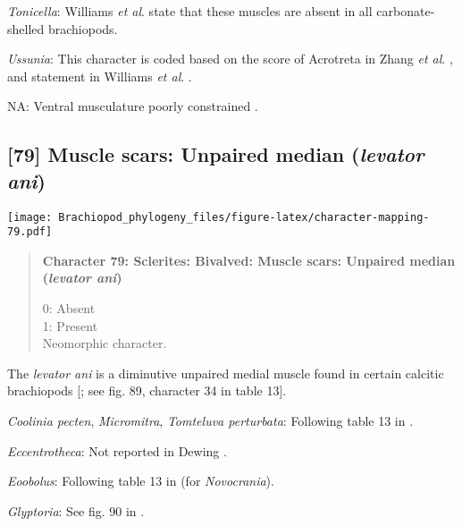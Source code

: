 \documentclass[openany]{book}
\theoremstyle{definition}
\theoremstyle{definition}
\theoremstyle{definition}
\theoremstyle{remark}
\begin{document}
\hypertarget{Tonicella-coding-78}{}
\emph{Tonicella}: Williams \emph{et al}.
\citeyearpar[p.~32]{Williams2000LinguliformeaCraniiformea} state that
these muscles are absent in all carbonate-shelled brachiopods.

\hypertarget{Ussunia-coding-78}{}
\emph{Ussunia}: This character is coded based on the score of Acrotreta
in Zhang \emph{et al}. \citeyearpar{Zhang2014Anearly}, and statement in
Williams \emph{et al}.
\citeyearpar[P.32]{Williams2000LinguliformeaCraniiformea}.

\hypertarget{NA-coding-78}{}
NA: Ventral musculature poorly constrained
\citep{Williams2000LinguliformeaCraniiformea, Popov2009Earlyontogeny}.

\subsection*{\texorpdfstring{{[}79{]} Muscle scars: Unpaired median
(\emph{levator
ani})}{{[}79{]} Muscle scars: Unpaired median (levator ani)}}\label{muscle-scars-unpaired-median-levator-ani}

\texttt{[image: Brachiopod\_phylogeny\_files/figure-latex/character-mapping-79.pdf]}

\begin{quote}
\textbf{Character 79: Sclerites: Bivalved: Muscle scars: Unpaired median
(\emph{levator ani})}

0: Absent\\
1: Present\\
Neomorphic character.
\end{quote}

The \emph{levator ani} is a diminutive unpaired medial muscle found in
certain calcitic brachiopods
{[}\citet{Williams2000LinguliformeaCraniiformea}; see fig. 89, character
34 in table 13{]}.

\hypertarget{Coolinia_pecten-coding-79}{}
\emph{Coolinia pecten}, \emph{Micromitra}, \emph{Tomteluva perturbata}:
Following table 13 in \citet{Williams2000LinguliformeaCraniiformea}.

\hypertarget{Eccentrotheca-coding-79}{}
\emph{Eccentrotheca}: Not reported in Dewing
\citeyearpar{Dewing2001Hingemodifications}.

\hypertarget{Eoobolus-coding-79}{}
\emph{Eoobolus}: Following table 13 in
\citet{Williams2000LinguliformeaCraniiformea} (for \emph{Novocrania}).

\hypertarget{Glyptoria-coding-79}{}
\emph{Glyptoria}: See fig. 90 in
\citet{Williams2000LinguliformeaCraniiformea}.
\end{document}
